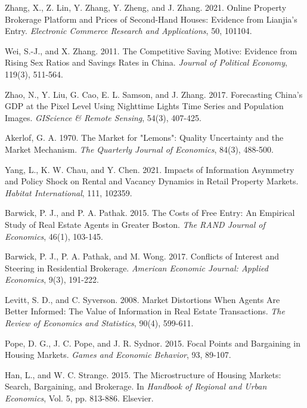 \documentclass[11pt]{article}
\begin{document}
\begin{singlespace}
\begin{thebibliography}{}
  Zhang, X., Z. Lin, Y. Zhang, Y. Zheng, and J. Zhang. 2021. Online Property Brokerage Platform and Prices of Second-Hand Houses: Evidence from Lianjia's Entry. \textit{Electronic Commerce Research and Applications}, 50, 101104.
  
  Wei, S.-J., and X. Zhang. 2011. The Competitive Saving Motive: Evidence from Rising Sex Ratios and Savings Rates in China. \textit{Journal of Political Economy}, 119(3), 511-564.
  
  Zhao, N., Y. Liu, G. Cao, E. L. Samson, and J. Zhang. 2017. Forecasting China’s GDP at the Pixel Level Using Nighttime Lights Time Series and Population Images. \textit{GIScience \& Remote Sensing}, 54(3), 407-425.
  
  Akerlof, G. A. 1970. The Market for "Lemons": Quality Uncertainty and the Market Mechanism. \textit{The Quarterly Journal of Economics}, 84(3), 488-500.
  
  Yang, L., K. W. Chau, and Y. Chen. 2021. Impacts of Information Asymmetry and Policy Shock on Rental and Vacancy Dynamics in Retail Property Markets. \textit{Habitat International}, 111, 102359.
  
  Barwick, P. J., and P. A. Pathak. 2015. The Costs of Free Entry: An Empirical Study of Real Estate Agents in Greater Boston. \textit{The RAND Journal of Economics}, 46(1), 103-145.
  
  Barwick, P. J., P. A. Pathak, and M. Wong. 2017. Conflicts of Interest and Steering in Residential Brokerage. \textit{American Economic Journal: Applied Economics}, 9(3), 191-222.
  
  Levitt, S. D., and C. Syverson. 2008. Market Distortions When Agents Are Better Informed: The Value of Information in Real Estate Transactions. \textit{The Review of Economics and Statistics}, 90(4), 599-611.
  
  Pope, D. G., J. C. Pope, and J. R. Sydnor. 2015. Focal Points and Bargaining in Housing Markets. \textit{Games and Economic Behavior}, 93, 89-107.
  
  Han, L., and W. C. Strange. 2015. The Microstructure of Housing Markets: Search, Bargaining, and Brokerage. In \textit{Handbook of Regional and Urban Economics}, Vol. 5, pp. 813-886. Elsevier.
  

\end{thebibliography}
\end{singlespace}
\end{document}
